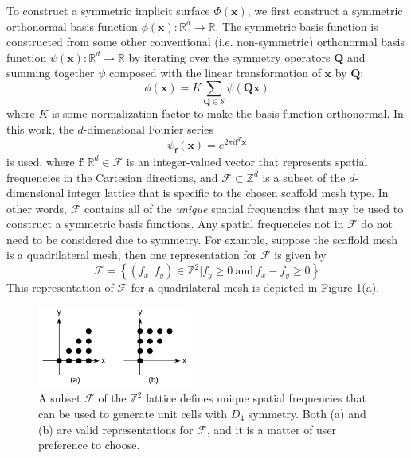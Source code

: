 \documentclass[acmtog]{acmart}
\begin{document}
To construct a symmetric implicit surface $\Phi(\mathbf{x})$, we first construct a symmetric orthonormal basis function $\phi(\mathbf{x}): \mathbb{R}^d \rightarrow \mathbb{R}$. The symmetric basis function is constructed from some other conventional (i.e. non-symmetric) orthonormal basis function $\psi(\mathbf{x}): \mathbb{R}^d \rightarrow \mathbb{R}$ by iterating over the symmetry operators $\mathbf{Q}$ and summing together $\psi$ composed with the linear transformation of $\mathbf{x}$ by $\mathbf{Q}$:
%
\begin{equation}
  \label{eq:basis_function}
  \phi(\mathbf{x}) = K \sum\limits_{\mathbf{Q} \in \mathcal{S}} \psi(\mathbf{Qx})
\end{equation}
%
where $K$ is some normalization factor to make the basis function orthonormal. In this work, the $d$-dimensional Fourier series
%
\begin{equation}
  \label{eq:fourier_series}
  \psi_{\mathbf{f}}(\mathbf{x}) = e^{2\pi i \mathbf{f}^T \mathbf{x}}
\end{equation}
%
is used, where $\mathbf{f}: \mathbb{R}^d \in \mathcal{F}$ is an integer-valued vector that represents spatial frequencies in the Cartesian directions, and $\mathcal{F} \subset \mathbb{Z}^d$ is a subset of the $d$-dimensional integer lattice that is specific to the chosen scaffold mesh type. In other words, $\mathcal{F}$ contains all of the \textit{unique} spatial frequencies that may be used to construct a symmetric basis functions. Any spatial frequencies not in $\mathcal{F}$ do not need to be considered due to symmetry. For example, suppose the scaffold mesh is a quadrilateral mesh, then one representation for $\mathcal{F}$ is given by
%
\begin{equation}
  \mathcal{F} = \left\{ (f_x, f_y) \in \mathbb{Z}^2 | f_y \geq 0 \: \text{and} \: f_x - f_y \geq 0 \right\}
\end{equation}
%
This representation of $\mathcal{F}$ for a quadrilateral mesh is depicted in Figure \ref{fig:unique_freqs_quad}(a).
%
\begin{figure}
  \centering
  \includegraphics[width=0.45\textwidth]{figures/quad_z_lattice_points.pdf}
  \caption{A subset $\mathcal{F}$ of the $\mathbb{Z}^2$ lattice defines unique spatial frequencies that can be used to generate unit cells with $D_4$ symmetry. Both (a) and (b) are valid representations for $\mathcal{F}$, and it is a matter of user preference to choose.}
  \label{fig:unique_freqs_quad}
\end{figure}
\end{document}
